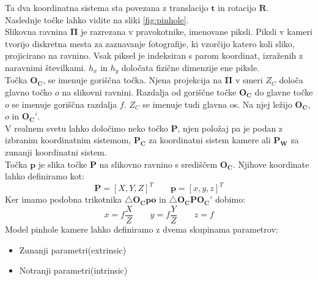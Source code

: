 Ta dva koordinatna sistema sta povezana z translacijo $\pmb{t}$ in rotacijo $\pmb{R}$. \\
Naslednje točke lahko vidite na sliki \ref{fig:pinhole}. \\
Slikovna ravnina $\pmb{\Pi}$ je razrezana v pravokotnike, imenovane piksli. Piksli v kameri tvorijo diskretna mesta za zaznavanje fotografije, ki vzorčijo katero koli sliko, projicirano na ravnino. Vsak piksel je indeksiran s parom koordinat, izraženih z naravnimi številkami. $h_x$ in $h_y$ določata fizične dimenzije ene piksle. \\
Točka $\pmb{O_C}$, se imenuje goriščna točka. Njena projekcija na $\pmb{\Pi}$ v smeri $Z_C$ določa glavno točko $o$ na slikovni ravnini. Razdalja od goriščne točke $\pmb{O_C}$ do glavne točke $o$ se imenuje goriščna razdalja $f$. $Z_C$ se imenuje tudi glavna os. Na njej ležijo $\pmb{O_C}$, $o$ in $\pmb{O_C'}$.\\
V realnem svetu lahko določimo neko točko $\pmb{P}$, njen položaj pa je podan z izbranim koordinatnim sistemom, $\pmb{P_C}$ za koordinatni sistem kamere ali $\pmb{P_W}$ za zunanji koordinatni sistem. \\
Točka $\pmb{p}$ je slika točke $\pmb{P}$ na slikovno ravnino s središčem $\pmb{O_C}$. Njihove koordinate lahko definiramo kot:
\[
    \pmb{P} = [X, Y, Z]^T  \qquad \pmb{p} = [x, y, z]^T
\]
Ker imamo podobna trikotnika $\triangle\pmb{O_C p o}$ in $\triangle\pmb{O_C P O_C'}$ dobimo:
\[
    x=f\frac{X}{Z} \qquad y=f\frac{Y}{Z} \qquad z =f
\]
Model pinhole kamere lahko definiramo z dvema skupinama parametrov:
\begin{itemize}
    \item Zunanji parametri(extrinsic)
    \item Notranji parametri(intrinsic)
\end{itemize}